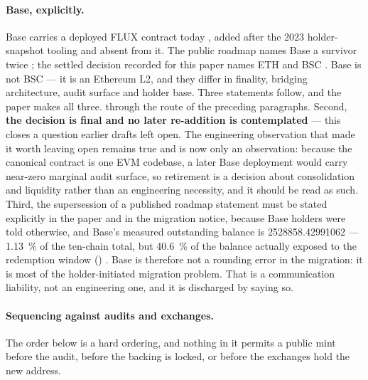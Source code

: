 \paragraph{Base, explicitly.} Base carries a deployed FLUX contract today
, added after the 2023 holder-snapshot tooling and
absent from it. The public roadmap names Base a survivor twice
; the settled decision recorded for this paper names ETH
and BSC . Base is not BSC --- it is an Ethereum L2, and they differ
in finality, bridging architecture, audit surface and holder base. Three statements follow, and the
paper makes all three.  through the route of the preceding paragraphs. Second, \textbf{the decision is final and no later
re-addition is contemplated}  --- this closes a question
earlier drafts left open. The engineering observation that made it worth leaving open remains true
and is now only an observation: because the canonical contract is one EVM codebase, a later Base
deployment would carry near-zero marginal audit surface, so retirement is a decision about
consolidation and liquidity rather than an engineering necessity, and it should be read as such.
Third, the supersession of a published roadmap statement must be stated explicitly in the paper and
in the migration notice, because Base holders were told otherwise, and Base's measured outstanding
balance is \num{2528858.42991062}\flux
{} --- \SI{1.13}{\percent} of the ten-chain
total, but \SI{40.6}{\percent} of the balance actually exposed to the redemption window
() \srcinferred. Base is therefore not a rounding error in the
migration: it is most of the holder-initiated migration problem. That is a communication liability,
not an engineering one, and it is discharged by saying so.

\paragraph{Sequencing against audits and exchanges.} The order below is a hard ordering, and nothing
in it permits a public mint before the audit, before the backing is locked, or before the exchanges
hold the new address. \planned

